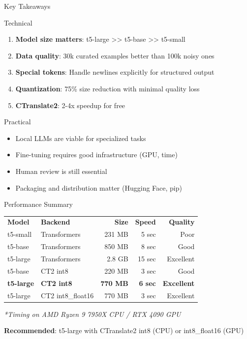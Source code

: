 \begin{frame}{Key Takeaways}
\begin{block}{Technical}
\begin{enumerate}
  \item \textbf{Model size matters}: t5-large >> t5-base >> t5-small
  \item \textbf{Data quality}: 30k curated examples better than 100k noisy ones
  \item \textbf{Special tokens}: Handle newlines explicitly for structured output
  \item \textbf{Quantization}: 75\% size reduction with minimal quality loss
  \item \textbf{CTranslate2}: 2-4x speedup for free
\end{enumerate}
\end{block}

\begin{block}{Practical}
\begin{itemize}
  \item Local LLMs are viable for specialized tasks
  \item Fine-tuning requires good infrastructure (GPU, time)
  \item Human review is still essential
  \item Packaging and distribution matter (Hugging Face, pip)
\end{itemize}
\end{block}
\end{frame}

\begin{frame}{Performance Summary}
\begin{center}
\begin{tabular}{l|l|r|r|r}
\textbf{Model} & \textbf{Backend} & \textbf{Size} & \textbf{Speed} & \textbf{Quality} \\[0.5ex]
t5-small & Transformers & 231 MB & 5 sec & Poor \\
t5-base & Transformers & 850 MB & 8 sec & Good \\
t5-large & Transformers & 2.8 GB & 15 sec & Excellent \\[0.5ex]
t5-base & CT2 int8 & 220 MB & 3 sec & Good \\
\textbf{t5-large} & \textbf{CT2 int8} & \textbf{770 MB} & \textbf{6 sec} & \textbf{Excellent} \\
t5-large & CT2 int8\_float16 & 770 MB & 3 sec & Excellent \\
\end{tabular}
\end{center}

\vspace{0.5cm}
\textit{*Timing on AMD Ryzen 9 7950X CPU / RTX 4090 GPU}

\vspace{0.5cm}
\textbf{Recommended}: t5-large with CTranslate2 int8 (CPU) or int8\_float16 (GPU)
\end{frame}

